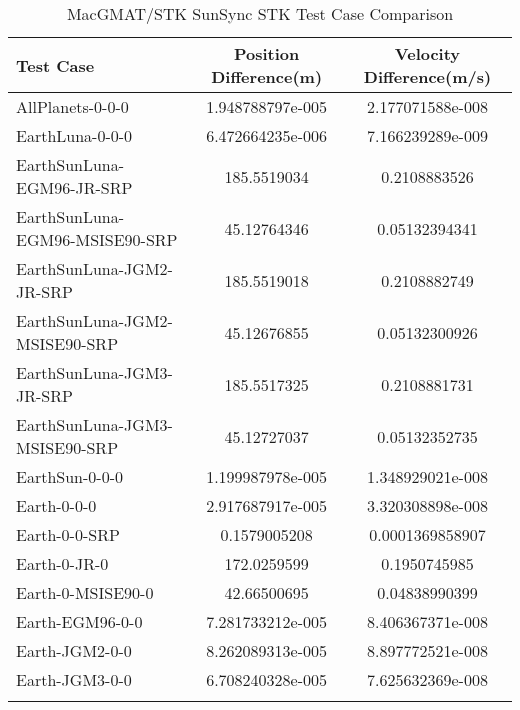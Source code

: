 \begin{table}[htbp!]
\centering
\caption{ MacGMAT/STK SunSync STK Test Case Comparison}
      \begin{tabular}{lcc}
      \hline\hline
          Test Case & Position Difference(m) & Velocity Difference(m/s) \\
         \hline
         AllPlanets-0-0-0 & 1.948788797e-005 & 2.177071588e-008 \\
         EarthLuna-0-0-0 & 6.472664235e-006 & 7.166239289e-009 \\
         EarthSunLuna-EGM96-JR-SRP & 185.5519034 & 0.2108883526 \\
         EarthSunLuna-EGM96-MSISE90-SRP & 45.12764346 & 0.05132394341 \\
         EarthSunLuna-JGM2-JR-SRP & 185.5519018 & 0.2108882749 \\
         EarthSunLuna-JGM2-MSISE90-SRP & 45.12676855 & 0.05132300926 \\
         EarthSunLuna-JGM3-JR-SRP & 185.5517325 & 0.2108881731 \\
         EarthSunLuna-JGM3-MSISE90-SRP & 45.12727037 & 0.05132352735 \\
         EarthSun-0-0-0 & 1.199987978e-005 & 1.348929021e-008 \\
         Earth-0-0-0 & 2.917687917e-005 & 3.320308898e-008 \\
         Earth-0-0-SRP & 0.1579005208 & 0.0001369858907 \\
         Earth-0-JR-0 & 172.0259599 & 0.1950745985 \\
         Earth-0-MSISE90-0 & 42.66500695 & 0.04838990399 \\
         Earth-EGM96-0-0 & 7.281733212e-005 & 8.406367371e-008 \\
         Earth-JGM2-0-0 & 8.262089313e-005 & 8.897772521e-008 \\
         Earth-JGM3-0-0 & 6.708240328e-005 & 7.625632369e-008 \\
      \hline\hline
      \label{Table: SunSync STK Table} 
\end{tabular}
\end{table}
